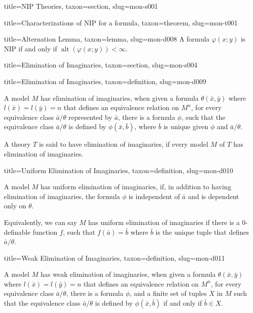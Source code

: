 \documentclass[a4paper]{article}
\begin{document}
\begin{tree}{title={NIP Theories}, taxon={section}, slug={mon-s001}}
\begin{tree}{title={Characterizations of NIP for a formula}, taxon={theorem}, slug={mon-t001}}
\begin{tree}{title={Alternation Lemma}, taxon={lemma}, slug={mon-d008}}
A formula \(\varphi (x;y)\) is NIP if and only if \(\operatorname {alt}( \varphi (x;y)) <  \infty\).
\end{tree}

\end{tree}

\end{tree}


    
    
\begin{tree}{title={Elimination of Imaginaries}, taxon={section}, slug={mon-s004}}

\begin{tree}{title={Elimination of Imaginaries}, taxon={definition}, slug={mon-d009}}

    A model \(M\) has elimination of imaginaries, when given a formula \(\theta ( \bar {x}, \bar {y})\) where \(l( \bar {x})=l( \bar {y})=n\) that defines an equivalence relation on \(M^n\), for every equivalence class \(\bar {a}/ \theta\) represented by \(\bar {a}\), there is a formula \(\phi\), such that the equivalence class \(\bar {a}/ \theta\) is defined by \(\phi ( \bar {x}, \bar {b})\), where \(\bar {b}\) is unique given \(\phi\) and \(\bar {a}/ \theta\).

    A theory \(T\) is said to have elimination of imaginaries, if every model \(M\) of \(T\) has elimination of imaginaries.

\end{tree}

\begin{tree}{title={Uniform Elimination of Imaginaries}, taxon={definition}, slug={mon-d010}}

    A model \(M\) has uniform elimination of imaginaries, if, in addition to having elimination of imaginaries, the formula \(\phi\) is independent of \(\bar {a}\) and is dependent only on \(\theta\). 
    
    Equivalently, we can say $M$ has uniform elimination of imaginaries if there is a $0$-definable function \(f\), such that \(f( \bar {a})= \bar {b}\) where \(\bar {b}\) is the unique tuple that defines \(\bar {a}/ \theta\).

\end{tree}

\begin{tree}{title={Weak Elimination of Imaginaries}, taxon={definition}, slug={mon-d011}}
  
    A model \(M\) has weak elimination of imaginaries, when given a formula \(\theta ( \bar {x}, \bar {y})\) where \(l( \bar {x})=l( \bar {y})=n\) that defines an equivalence relation on \(M^n\), for every equivalence class \(\bar {a}/ \theta\), there is a formula \(\phi\), and a finite set of tuples \(X\) in \(M\) such that the equivalence class \(\bar {a}/ \theta\) is defined by \(\phi ( \bar {x}, \bar {b})\) if and only if \(\bar {b} \in  X\).
    

\end{tree}
\end{tree}
\end{document}
